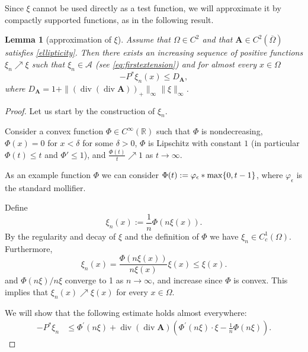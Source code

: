 \documentclass[12pt,a4paper]{amsart}
\newtheorem{lemma}[theorem]{\bf Lemma}
\theoremstyle{definition}
\newcommand{\A}{\mathbf{A}}
\newcommand*\Div{\operatorname{div}}
\begin{document}
Since $\xi$ cannot be used directly as a test function, we will approximate it by compactly supported functions, as in the following result.

\begin{lemma}[approximation of $\xi$]\label{lem:specialxi}
    Assume that $\Omega \in C^{2}$ and that $\A\in C^{2}(\overline{\Omega})$ satisfies \eqref{ellipticity}. Then there exists an increasing sequence of positive functions $\xi_n\nearrow \xi$ such that $\xi_n \in \mathcal{A}$ (see \eqref{eq:firstextension}) 
    and for almost every $x\in \Omega$
    $$
        -P^*\xi_n (x) \le D_{\A},
    $$
    where  $D_{\A}=  1+ \| (\Div(\Div\A ))_+\|_{\infty}\|\xi\|_\infty$.
\end{lemma}
\begin{proof}
    \smallskip
    \noindent
    Let us start by the construction of $\xi_n$.
    
     Consider a convex function $\Phi\in C^\infty (\mathbb{R})$ such that $\Phi$ is nondecreasing, $\Phi(x)= 0$ for $x<\delta$ for some $\delta>0$, $\Phi$ is Lipschitz with constant $1$ (in particular  $\Phi(t)\le t$ and $\Phi' \leq 1$),  
     and $\frac{\Phi(t)}{t}\nearrow 1$ as $t\to \infty$.

     As an example function $\Phi$ we can consider $\Phi (t):= \varphi_\epsilon * {\rm max}\{ 0, t-1\}$, where $\varphi_\epsilon$ is the standard mollifier.

    Define 
    $$
        \xi_n(x):= \frac{1}{n}\Phi (n\xi (x)) .
    $$
    By the regularity and decay of $\xi$ and the definition of $\Phi$ we have $\xi_n\in C^1_c(\Omega)$. 
    Furthermore, 
    $$
        \xi_n (x) = \frac{\Phi (n\xi (x))}{n\xi (x)}\xi (x) \le \xi(x).
    $$
    and $\Phi(n\xi)/n\xi$ converge to 1 as $n\to \infty$, and increase since $\Phi$ is convex. This implies that 
    $
        \xi_n(x)\nearrow \xi (x)
    $
    for every $x\in \Omega$.
    
    
    We will show that
     the following estimate holds almost everywhere:
    \begin{align*}
    - P^*\xi_n &\le \Phi^{'}(n\xi) + \Div(\Div\A)(\Phi^{'}(n\xi)\cdot\xi-\frac{1}{n}\Phi(n\xi)).
    \end{align*}
    

\end{proof}
\end{document}
